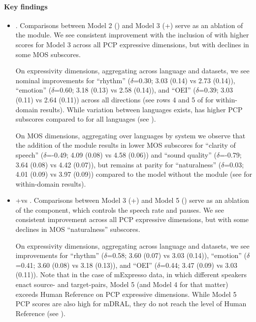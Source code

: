 \paragraph{Key findings}
\begin{itemize}
    \item \ptv. Comparisons between Model 2 (\mfourttwo) and Model 3 (\mfourttwo+\ptv) serve as an ablation of the \ptv module. We see consistent improvement with the inclusion of \ptv with higher scores for Model 3 across all PCP expressive dimensions, but with declines in some MOS subscores.
    
    On expressivity dimensions, aggregating across language and datasets, we see nominal improvements for ``rhythm'' ($\delta$=0.30; 3.03 (0.14) vs 2.73 (0.14)), ``emotion'' ($\delta$=0.60; 3.18 (0.13) vs 2.58 (0.14)), and ``OEI'' ($\delta$=0.39; 3.03 (0.11) vs 2.64 (0.11)) across all \xeng directions (see rows 4 and 5 of  for within-domain results). While variation between languages exists, \ptv has higher PCP subscores compared to \mfourttwo for all languages (see ). 
    
    On MOS dimensions, aggregating over languages by system we observe that the addition of the \ptv module results in lower MOS subscores for ``clarity of speech'' ($\delta$=-0.49; 4.09 (0.08) vs 4.58 (0.06)) and ``sound quality'' ($\delta$=-0.79; 3.64 (0.08) vs 4.42 (0.07)), but remains at parity for ``naturalness'' ($\delta$=0.03; 4.01 (0.09) vs 3.97 (0.09)) compared to the \mfourttwo model without the \ptv module (see  for within-domain results). 

    \item \mfourttwo+\ptv vs \seamlessexpressive. Comparisons between Model 3 (\mfourttwo+\ptv) and Model 5 (\seamlessexpressive) serve as an ablation of the \prosodyunitytwo component, which controls the speech rate and pauses. We see consistent improvement across all PCP expressive dimensions, but with some declines in MOS ``naturalness'' subscores.
    
    On expressivity dimensions, aggregating across language and datasets, we see improvements for ``rhythm'' ($\delta$=0.58; 3.60 (0.07) vs 3.03 (0.14)), ``emotion'' ($\delta$=0.41; 3.60 (0.08) vs 3.18 (0.13)), and ``OEI'' ($\delta$=0.44; 3.47 (0.09) vs 3.03 (0.11)). Note that in the case of mExpresso data, in which different speakers enact source- and target-pairs, Model 5 (and Model 4 for that matter) exceeds Human Reference on PCP expressive dimensions. While Model 5 PCP scores are also high for mDRAL, they do not reach the level of Human Reference (see ).


\end{itemize}
